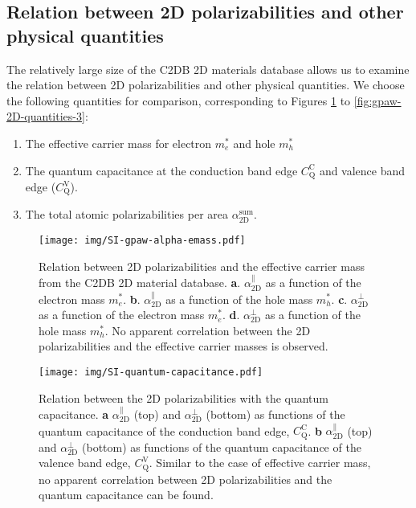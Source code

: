 \documentclass[manuscript=suppinfo,email=true,hyperref=true,keywords=false]{achemso}
\begin{document}
\subsection{Relation between 2D polarizabilities and other physical quantities}
\label{sec:gpaw-3}

The relatively large size of the C2DB 2D materials database allows us
to examine the relation between 2D polarizabilities and other physical
quantities. We choose the following quantities for comparison,
corresponding to Figures \ref{fig:gpaw-2D-quantities-1} to
\ref{fig:gpaw-2D-quantities-3}:
\begin{enumerate}
\item The effective carrier mass for electron $m_{e}^{*}$ and hole $m_{h}^{*}$
  
\item The quantum capacitance at the conduction band edge
  $C_{\mathrm{Q}}^{\mathrm{C}}$ and valence band edge
  ($C_{\mathrm{Q}}^{\mathrm{V}}$).

  
\item The total atomic polarizabilities per area $\alpha_{\mathrm{2D}}^{\mathrm{sum}}$.
\end{enumerate}
\begin{figure}[htbp]
  \centering
  \texttt{[image: img/SI-gpaw-alpha-emass.pdf]}
  \caption{Relation between 2D polarizabilities and the effective
    carrier mass from the C2DB 2D material
    database. \textbf{a}. $\alpha_{\mathrm{2D}}^{\parallel}$ as a function of the
    electron mass $m_{e}^{*}$.  \textbf{b}. $\alpha_{\mathrm{2D}}^{\parallel}$ as a
    function of the hole mass
    $m_{h}^{*}$. \textbf{c}. $\alpha_{\mathrm{2D}}^{\perp}$ as a function of the
    electron mass $m_{e}^{*}$.  \textbf{d}. $\alpha_{\mathrm{2D}}^{\perp}$ as a
    function of the hole mass $m_{h}^{*}$. No apparent correlation
    between the 2D polarizabilities and the effective carrier masses
    is observed.}
  \label{fig:gpaw-2D-quantities-1}
\end{figure}

\begin{figure}[htbp]
  \centering
  \texttt{[image: img/SI-quantum-capacitance.pdf]}
  \caption{Relation between the 2D polarizabilities with the quantum
    capacitance. \textbf{a} $\alpha_{\mathrm{2D}}^{\parallel}$ (top) and
    $\alpha_{\mathrm{2D}}^{\perp}$ (bottom) as functions of the quantum capacitance
    of the conduction band edge,
    $C_{\mathrm{Q}}^{\mathrm{C}}$. \textbf{b} $\alpha_{\mathrm{2D}}^{\parallel}$
    (top) and $\alpha_{\mathrm{2D}}^{\perp}$ (bottom) as functions of the quantum
    capacitance of the valence band edge,
    $C_{\mathrm{Q}}^{\mathrm{V}}$. Similar to the case of effective
    carrier mass, no apparent correlation between 2D polarizabilities
    and the quantum capacitance can be found.}
  \label{fig:gpaw-2D-quantities-2}
\end{figure}
\end{document}
